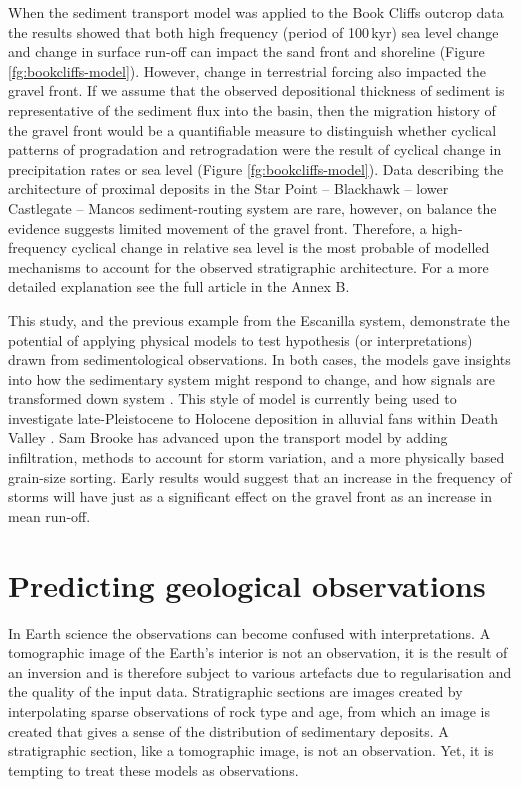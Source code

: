 When the sediment transport model was applied to the Book Cliffs outcrop data the results showed that both high frequency (period of 100\,kyr) sea level change and change in surface run-off can impact the sand front and shoreline (Figure \ref{fg:bookcliffs-model}). However, change in terrestrial forcing also impacted the gravel front. If we assume that the observed depositional thickness of sediment is representative of the sediment flux into the basin, then the migration history of the gravel front would be a quantifiable measure to distinguish whether cyclical patterns of progradation and retrogradation were the result of cyclical change in precipitation rates or sea level (Figure \ref{fg:bookcliffs-model}). Data describing the architecture of proximal deposits in the Star Point -- Blackhawk -- lower Castlegate -- Mancos sediment-routing system are rare, however, on balance the evidence suggests limited movement of the gravel front. Therefore, a high-frequency cyclical change in relative sea level is the most probable of modelled mechanisms to account for the observed stratigraphic architecture. For a more detailed explanation see the full article in the Annex B.

This study, and the previous example from the Escanilla system, demonstrate the potential of applying physical models to test hypothesis (or interpretations) drawn from sedimentological observations. In both cases, the models gave insights into how the sedimentary system might respond to change, and how signals are transformed down system \citep{armitage-etal-ngeo-2011}. This style of model is currently being used to investigate late-Pleistocene to Holocene deposition in alluvial fans within Death Valley \citep[see][]{brooke-etal-2018}. Sam Brooke has advanced upon the transport model by adding infiltration, methods to account for storm variation, and a more physically based grain-size sorting. Early results would suggest that an increase in the frequency of storms will have just as a significant effect on the gravel front as an increase in mean run-off. 

\section{Predicting geological observations}

In Earth science the observations can become confused with interpretations. A tomographic image of the Earth's interior is not an observation, it is the result of an inversion and is therefore subject to various artefacts due to regularisation and the quality of the input data. Stratigraphic sections are images created by interpolating sparse observations of rock type and age, from which an image is created that gives a sense of the distribution of sedimentary deposits. A stratigraphic section, like a tomographic image, is not an observation. Yet, it is tempting to treat these models as observations.


